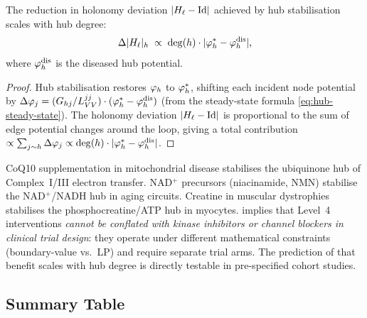 \begin{proposition}
\label{prop:hub-degree-scaling}
The reduction in holonomy deviation $|H_\ell - \mathrm{Id}|$ achieved by hub
stabilisation scales with hub degree:
\[
  \Delta|H_\ell|_h \;\propto\; \deg(h) \cdot |\varphi_h^* - \varphi_h^{\mathrm{dis}}|,
\]
where $\varphi_h^{\mathrm{dis}}$ is the diseased hub potential.
\end{proposition}

\begin{proof}
Hub stabilisation restores $\varphi_h$ to $\varphi_h^*$, shifting
each incident node potential by $\Delta\varphi_j = (G_{hj}/L_{VV}^{jj})
\cdot (\varphi_h^* - \varphi_h^{\mathrm{dis}})$ (from the
steady-state formula \eqref{eq:hub-steady-state}).  The holonomy deviation
$|H_\ell - \mathrm{Id}|$ is proportional to the sum of edge potential changes
around the loop, giving a total contribution $\propto \sum_{j \sim h} \Delta\varphi_j
\propto \deg(h) \cdot |\varphi_h^* - \varphi_h^{\mathrm{dis}}|$.
\end{proof}

\begin{remark}
CoQ10 supplementation in mitochondrial disease stabilises the ubiquinone hub of
Complex~I/III electron transfer.  NAD$^+$ precursors (niacinamide, NMN) stabilise
the NAD$^+$/NADH hub in aging circuits.  Creatine in muscular dystrophies
stabilises the phosphocreatine/ATP hub in myocytes.  
implies that Level~4 interventions \emph{cannot be conflated with kinase
inhibitors or channel blockers in clinical trial design}: they operate under
different mathematical constraints (boundary-value vs.\ LP) and require
separate trial arms.  The prediction of  that
benefit scales with hub degree is directly testable in pre-specified cohort
studies.
\end{remark}

\subsection{Summary Table}

